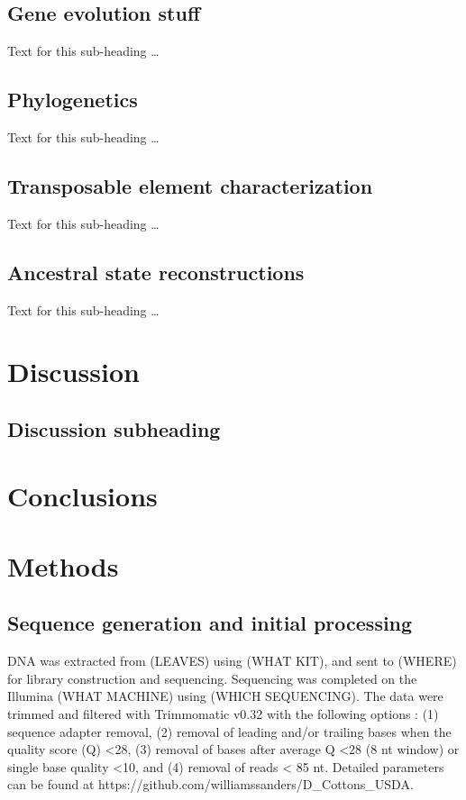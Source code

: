 \documentclass{bmcart}
\newcommand{\note}[2][]{\added[id=#1,remark={#2}]{}}
\begin{document}
\subsection*{Gene evolution stuff}
Text for this sub-heading \ldots

\subsection*{Phylogenetics}
Text for this sub-heading \ldots

\subsection*{Transposable element characterization}
Text for this sub-heading \ldots

\subsection*{Ancestral state reconstructions}
Text for this sub-heading \ldots

\section*{Discussion}
\subsection*{Discussion subheading}

\section*{Conclusions}

\section*{Methods}
\subsection*{Sequence generation and initial processing}
DNA was extracted from (LEAVES) using (WHAT KIT), and sent to (WHERE) for library construction and sequencing.  Sequencing was completed on the Illumina (WHAT MACHINE) using (WHICH SEQUENCING). The data were trimmed and filtered with Trimmomatic v0.32 \note[Corrinne]{citation} with the following options : (1) sequence adapter removal, (2) removal of leading and/or trailing bases when the quality score (Q) <28, (3) removal of bases after average Q <28 (8 nt window) or single base quality <10, and (4) removal of reads < 85 nt. Detailed parameters can be found at https://github.com/williamssanders/D\_Cottons\_USDA. \note[Corrinne]{Let's port this repo to a lab site after and give the new url}
\end{document}

